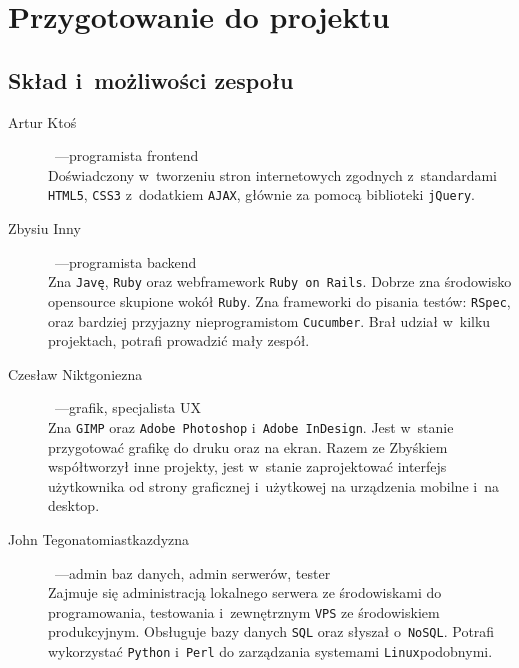 \documentclass[10pt,a4paper]{article}
\begin{document}
\section{Przygotowanie do projektu}

\subsection{Skład i~możliwości zespołu}

\begin{description}
  \item[Artur Ktoś]~---\quad programista front\dywiz end \hfill \\
    Doświadczony w~tworzeniu stron internetowych zgodnych z~standardami
    \texttt{HTML5}, \texttt{CSS3} z~dodatkiem \texttt{AJAX}, głównie za pomocą
    biblioteki \texttt{jQuery}.
  \item[Zbysiu Inny]~---\quad programista back\dywiz end \hfill \\
    Zna \texttt{Javę}, \texttt{Ruby} oraz web\dywiz framework \texttt{Ruby on
    Rails}.  Dobrze zna środowisko open\dywiz source skupione wokół
    \texttt{Ruby}. Zna frameworki do pisania testów: \texttt{RSpec}, oraz
    bardziej przyjazny nie\dywiz programistom \texttt{Cucumber}. Brał udział
    w~kilku projektach, potrafi prowadzić mały zespół.
  \item[Czesław Niktgoniezna]~---\quad grafik, specjalista UX \hfill \\
    Zna \texttt{GIMP} oraz {\tt Adobe Photoshop} i~\texttt{Adobe InDesign}.
    Jest w~stanie przygotować grafikę do druku oraz na ekran. Razem ze Zbyśkiem
    współtworzył inne projekty, jest w~stanie zaprojektować interfejs
    użytkownika od strony graficznej i~użytkowej na urządzenia mobilne i~na
    desktop.
  \item[John Tegonatomiastkazdyzna]~---\quad admin baz danych, admin serwerów, tester \hfill \\
    Zajmuje się administracją lokalnego serwera ze środowiskami do
    programowania, testowania i~zewnętrznym \texttt{VPS} ze środowiskiem
    produkcyjnym. Obsługuje bazy danych \texttt{SQL} oraz słyszał
    o~\texttt{NoSQL}. Potrafi wykorzystać \texttt{Python} i~\texttt{Perl} do
    zarządzania systemami \texttt{Linux}\dywiz podobnymi.
\end{description}
\end{document}
